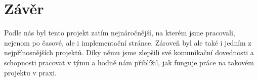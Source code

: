\documentclass[11pt,a4paper]{article}
\begin{document}
    \newpage

\section{Závěr}

    Podle nás byl tento projekt zatím nejnáročnější, na kterém jsme pracovali, nejenom po časové, ale i implementační stránce. Zároveň byl ale také i jedním z nejpřínosnějších projektů. Díky němu jsme zlepšili své komunikační dovednosti a schopnosti pracovat v týmu a hodně nám přiblížil, jak funguje práce na takovém projektu v praxi.

    \newpage
    
\end{document}

